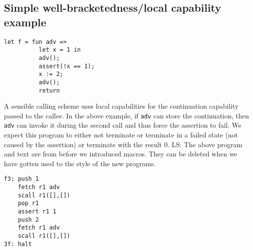 \documentclass[a4paper]{article}
\newcommand\lau[1]{{\color{purple} \sf \footnotesize {LS: #1}}\\}
\begin{document}
\subsection{Simple well-bracketedness/local capability example}
\begin{verbatim}
let f = fun adv =>
          let x = 1 in
          adv();
          assert(!x == 1);
          x := 2;
          adv();
          return
\end{verbatim}
              A sensible calling scheme uses local capabilities for the continuation capability passed to the callee. In the above example, if \texttt{adv} can store the continuation, then 
              \texttt{adv} can invoke it during the second call and thus force the assertion to fail. We expect this program to either not terminate or terminate in a failed state (not caused by the assertion) or terminate with the result 0.
\lau{The above program and text are from before we introduced macros. They can be deleted when we have gotten used to the style of the new programs. }

\begin{verbatim}
f3: push 1
    fetch r1 adv
    scall r1([],[])
    pop r1
    assert r1 1
    push 2
    fetch r1 adv
    scall r1([],[])
3f: halt
\end{verbatim}
\end{document}
